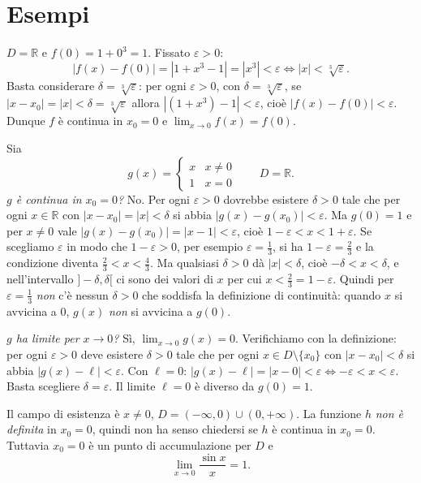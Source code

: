 \documentclass[11pt,a4paper]{article}
\begin{document}
\section{Esempi}

\begin{esempio}[$f(x) = 1 + x^3$ è continua in $x_0 = 0$]
$D = \mathbb{R}$ e $f(0) = 1 + 0^3 = 1$. Fissato $\varepsilon > 0$:
\[
|f(x) - f(0)| = |1 + x^3 - 1| = |x^3| < \varepsilon \iff |x| < \sqrt[3]{\varepsilon} .
\]
Basta considerare $\delta = \sqrt[3]{\varepsilon}$: per ogni $\varepsilon > 0$, con $\delta = \sqrt[3]{\varepsilon}$, se $|x - x_0| = |x| < \delta = \sqrt[3]{\varepsilon}$ allora $|(1 + x^3) - 1| < \varepsilon$, cioè $|f(x) - f(0)| < \varepsilon$. Dunque $f$ è continua in $x_0 = 0$ e $\lim_{x \to 0} f(x) = f(0)$.
\end{esempio}

\begin{esempio}
Sia
\[
g(x) = \begin{cases} x & x \neq 0 \\ 1 & x = 0 \end{cases}
\qquad D = \mathbb{R} .
\]
\emph{$g$ è continua in $x_0 = 0$?} No. Per ogni $\varepsilon > 0$ dovrebbe esistere $\delta > 0$ tale che per ogni $x \in \mathbb{R}$ con $|x - x_0| = |x| < \delta$ si abbia $|g(x) - g(x_0)| < \varepsilon$. Ma $g(0) = 1$ e per $x \ne 0$ vale $|g(x) - g(x_0)| = |x - 1| < \varepsilon$, cioè $1 - \varepsilon < x < 1 + \varepsilon$. Se scegliamo $\varepsilon$ in modo che $1 - \varepsilon > 0$, per esempio $\varepsilon = \tfrac{1}{3}$, si ha $1 - \varepsilon = \tfrac{2}{3}$ e la condizione diventa $\tfrac{2}{3} < x < \tfrac{4}{3}$. Ma qualsiasi $\delta > 0$ dà $|x| < \delta$, cioè $-\delta < x < \delta$, e nell'intervallo $]-\delta, \delta[$ ci sono dei valori di $x$ per cui $x < \tfrac{2}{3} = 1 - \varepsilon$. Quindi per $\varepsilon = \tfrac{1}{3}$ \emph{non} c'è nessun $\delta > 0$ che soddisfa la definizione di continuità: quando $x$ si avvicina a $0$, $g(x)$ \emph{non} si avvicina a $g(0)$.

\emph{$g$ ha limite per $x \to 0$?} Sì, $\displaystyle\lim_{x\to 0} g(x) = 0$. Verifichiamo con la definizione: per ogni $\varepsilon > 0$ deve esistere $\delta > 0$ tale che per ogni $x \in D \setminus \{x_0\}$ con $|x - x_0| < \delta$ si abbia $|g(x) - \ell| < \varepsilon$. Con $\ell = 0$: $|g(x) - \ell| = |x - 0| < \varepsilon \iff -\varepsilon < x < \varepsilon$. Basta scegliere $\delta = \varepsilon$. Il limite $\ell = 0$ è diverso da $g(0) = 1$.
\end{esempio}

\begin{esempio}[$h(x) = \dfrac{\sin x}{x}$]
Il campo di esistenza è $x \neq 0$, $D = (-\infty, 0) \cup (0, +\infty)$. La funzione $h$ \emph{non è definita} in $x_0 = 0$, quindi non ha senso chiedersi se $h$ è continua in $x_0 = 0$. Tuttavia $x_0 = 0$ è un punto di accumulazione per $D$ e
\[
\lim_{x \to 0} \frac{\sin x}{x} = 1 .
\]
\end{esempio}
\end{document}
